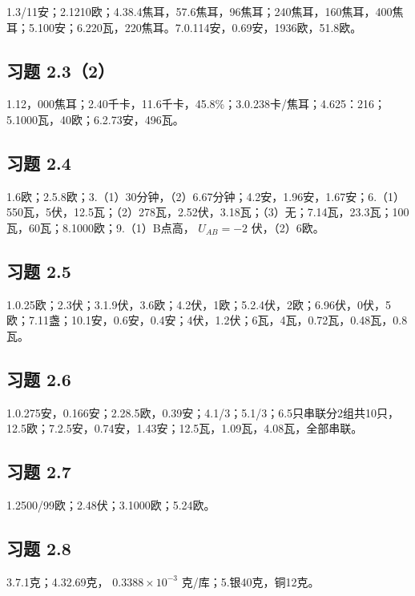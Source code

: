 1.3/11安；2.1210欧；4.38.4焦耳，57.6焦耳，96焦耳；240焦耳，160焦耳，400焦耳；5.100安；6.220瓦，220焦耳。7.0.114安，0.69安，1936欧，51.8欧。

\subsection{习题 2.3（2）}\label{ux4e60ux9898-2.32-1}

1.12，000焦耳；2.40千卡，11.6千卡，45.8\%；3.0.238卡/焦耳；4.625：216；5.1000瓦，40欧；6.2.73安，496瓦。

\subsection{习题 2.4}\label{ux4e60ux9898-2.4-1}

1.6欧；2.5.8欧；3.（1）30分钟，（2）6.67分钟；4.2安，1.96安，1.67安；6.（1）550瓦，5伏，12.5瓦；（2）278瓦，2.52伏，3.18瓦；（3）无；7.14瓦，23.3瓦；100瓦，60瓦；8.1000欧；9.（1）B点高，
\(U_{AB}=-2\) 伏，（2）6欧。

\subsection{习题 2.5}\label{ux4e60ux9898-2.5-1}

1.0.25欧；2.3伏；3.1.9伏，3.6欧；4.2伏，1欧；5.2.4伏，2欧；6.96伏，0伏，5欧；7.11盏；10.1安，0.6安，0.4安；4伏，1.2伏；6瓦，4瓦，0.72瓦，0.48瓦，0.8瓦。

\subsection{习题 2.6}\label{ux4e60ux9898-2.6-1}

1.0.275安，0.166安；2.28.5欧，0.39安；4.1/3；5.1/3；6.5只串联分2组共10只，12.5欧；7.2.5安，0.74安，1.43安；12.5瓦，1.09瓦，4.08瓦，全部串联。

\subsection{习题 2.7}\label{ux4e60ux9898-2.7-1}

1.2500/99欧；2.48伏；3.1000欧；5.24欧。

\subsection{习题 2.8}\label{ux4e60ux9898-2.8-1}

3.7.1克；4.32.69克， \(0.3388 \times 10^{-3}\) 克/库；5.银40克，铜12克。

